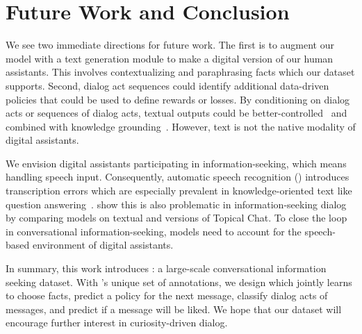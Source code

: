 \section{Future Work and Conclusion}
\label{sec:fw}

We see two immediate directions for future work.
The first is to augment our \charm{} model with a text generation module to make a digital version of our human assistants.
This involves contextualizing and paraphrasing facts which our dataset supports.
Second, dialog act sequences could identify additional data-driven policies that could be used to define rewards or losses.
By conditioning on dialog acts or sequences of dialog acts, textual outputs could be better-controlled~\citep{Sankar2019DeepRL,See2019WhatMA} and combined with knowledge grounding~\citep{hedayatnia2020policy}.
However, text is not the native modality of digital assistants.

We envision digital assistants participating in information-seeking, which means handling speech input.
Consequently, automatic speech recognition () introduces transcription errors which are especially prevalent in knowledge-oriented text like question answering~\citep{peskov2019noisy}.
\citet{gopalakrishnan2020asr} show this is also problematic in information-seeking dialog by comparing models on textual and  versions of Topical Chat.
To close the loop in conversational information-seeking, models need to account for the speech-based environment of digital assistants.

In summary, this work introduces \rover{}: a large-scale conversational information seeking dataset.
With \rover{}'s unique set of annotations, we design \charm{} which jointly learns to choose facts, predict a policy for the next message, classify dialog acts of messages, and predict if a message will be liked.
We hope that our dataset will encourage further interest in curiosity-driven dialog.
